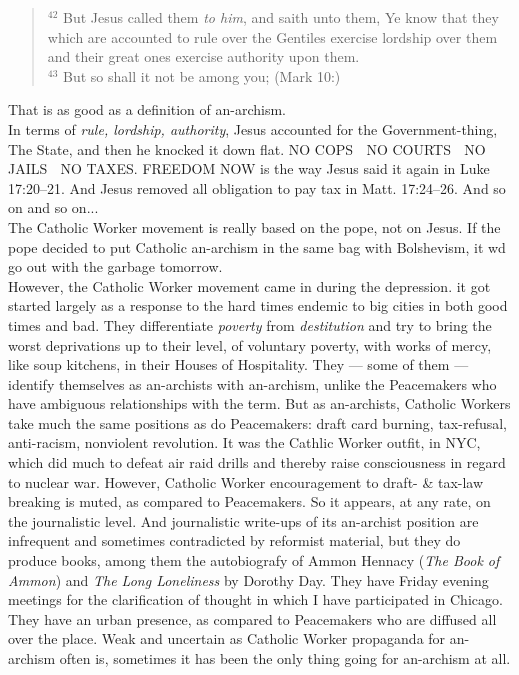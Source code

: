 \blockquote{$^{42}$ But Jesus called them \emph{to him}, and saith unto them, Ye know that they which are accounted to rule over the Gentiles exercise lordship over them and their great ones exercise authority upon them.\\
$^{43}$ But so shall it not be among you; (Mark 10:)}
That is as good as a definition of an-archism.\\
In terms of \emph{rule, lordship, authority}, Jesus accounted for the Government-thing, The State, and then he knocked it down flat. NO COPS $\;$ NO COURTS $\;$ NO JAILS $\;$ NO TAXES. FREEDOM NOW is the way Jesus said it again in Luke 17:20--21. And Jesus removed all obligation to pay tax in Matt. 17:24--26. And so on and so on...\\
The Catholic Worker movement is really based on the pope, not on Jesus. If the pope decided to put Catholic an-archism in the same bag with Bolshevism, it wd go out with the garbage tomorrow.\\
However, the Catholic Worker movement came in during the depression. it got started largely as a response to the hard times endemic to big cities in both good times and bad. They differentiate \emph{poverty} from \emph{destitution} and try to bring the worst deprivations up to their level, of voluntary poverty, with works of mercy, like soup kitchens, in their Houses of Hospitality. They --- some of them --- identify themselves as an-archists with an-archism, unlike the Peacemakers who have ambiguous relationships with the term. But as an-archists, Catholic Workers take much the same positions as do Peacemakers: draft card burning, tax-refusal, anti-racism, nonviolent revolution. It was the Cathlic Worker outfit, in NYC, which did much to defeat air raid drills and thereby raise consciousness in regard to nuclear war. However, Catholic Worker encouragement to draft- \& tax-law breaking is muted, as compared to Peacemakers. So it appears, at any rate, on the journalistic level. And journalistic write-ups of its an-archist position are infrequent and sometimes contradicted by reformist material, but they do produce books, among them the autobiografy of Ammon Hennacy (\emph{The Book of Ammon}) and \emph{The Long Loneliness} by Dorothy Day. They have Friday evening meetings for the clarification of thought in which I have participated in Chicago. They have an urban presence, as compared to Peacemakers who are diffused all over the place. Weak and uncertain as Catholic Worker propaganda for an-archism often is, sometimes it has been the only thing going for an-archism at all.\\
